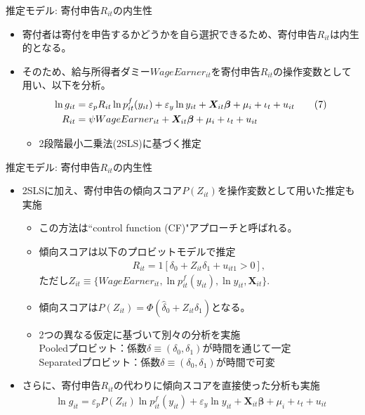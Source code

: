\documentclass[dvipdfmx,10pt]{beamer}
\begin{document}
\begin{frame}{推定モデル: 寄付申告$R_{it}$の内生性}
	\begin{itemize}
		\item 寄付者は寄付を申告するかどうかを自ら選択できるため、寄付申告$R_{it}$は内生的となる。
		\item そのため、給与所得者ダミー$WageEarner_{it}$を寄付申告$R_{it}$の操作変数として用い、以下を分析。
		\begin{align}
			\ln g_{it} &= \varepsilon_pR_{it} \ln p_{it}^f(y_{it}) + \varepsilon_y \ln y_{it} + \bm{X}_{it}\bm{\beta} + \mu_i + \iota_t + u_{it}\tag{7}\\
			R_{it} &=\psi WageEarner_{it}+\bm{X}_{it}\bm{\beta} + \mu_i + \iota_t + u_{it}\notag
		\end{align} 
	 	\begin{itemize}
	 		\item 2段階最小二乗法(2SLS)に基づく推定
		\end{itemize}
	\end{itemize}
\end{frame}

\begin{frame}{推定モデル: 寄付申告$R_{it}$の内生性}
	\begin{itemize}
		\item 2SLSに加え、寄付申告の傾向スコア$P(Z_{it})$を操作変数として用いた推定も実施
		\begin{itemize}
			\item この方法は``control function (CF)"アプローチと呼ばれる。
			\item 傾向スコアは以下のプロビットモデルで推定
			\begin{align}
				R_{it}=1[\delta_0+Z_{it}\delta_1+u_{it1}>0]\tag{8},
			\end{align}
			ただし$Z_{it}\equiv \{WageEarner_{it}, \ln p_{it}^f(y_{it}), \ln y_{it}, \bm{X}_{it}\}$.
			\item 傾向スコアは$P(Z_{it})=\Phi(\hat{\delta}_0+Z_{it}\hat{\delta}_1)$となる。
			\item 2つの異なる仮定に基づいて別々の分析を実施\\
			  Pooledプロビット：係数$\delta\equiv (\delta_0, \delta_1)$が時間を通じて一定\\
			  Separatedプロビット：係数$\delta\equiv (\delta_0, \delta_1)$が時間で可変
		\end{itemize}
		\item さらに、寄付申告$R_{it}$の代わりに傾向スコアを直接使った分析も実施
		\begin{align}
			\ln g_{it} = \varepsilon_pP(Z_{it})\ln p_{it}^f(y_{it}) + \varepsilon_y \ln y_{it} + \bm{X}_{it}\bm{\beta} + \mu_i + \iota_t + u_{it}\tag{9}
		\end{align}
	\end{itemize}
\end{frame}
\end{document}
